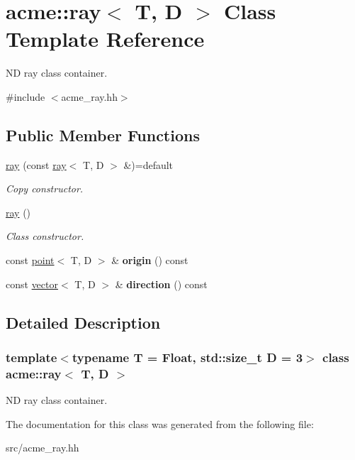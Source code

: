 \hypertarget{classacme_1_1ray}{}\section{acme\+:\+:ray$<$ T, D $>$ Class Template Reference}
\label{classacme_1_1ray}


ND ray class container.  




{\ttfamily \#include $<$acme\+\_\+ray.\+hh$>$}

\subsection*{Public Member Functions}
\begin{DoxyCompactItemize}
\item 
\mbox{\label{classacme_1_1ray_a181a7fb12af08ba45ff41f39920df03c}} 
\hyperlink{classacme_1_1ray_a181a7fb12af08ba45ff41f39920df03c}{ray} (const \hyperlink{classacme_1_1ray}{ray}$<$ T, D $>$ \&)=default
\begin{DoxyCompactList}\small\item\em Copy constructor. \end{DoxyCompactList}\item 
\mbox{\label{classacme_1_1ray_afc8290a7430024f99fb291dbb5bbcc62}} 
\hyperlink{classacme_1_1ray_afc8290a7430024f99fb291dbb5bbcc62}{ray} ()
\begin{DoxyCompactList}\small\item\em Class constructor. \end{DoxyCompactList}\item 
\mbox{\label{classacme_1_1ray_a0d9212763d822b70260723d277ea3cf1}} 
const \hyperlink{classacme_1_1point}{point}$<$ T, D $>$ \& {\bfseries origin} () const
\item 
\mbox{\label{classacme_1_1ray_af6ae286bbd1a15ba0c5f7419fc30a1fa}} 
const \hyperlink{classacme_1_1vector}{vector}$<$ T, D $>$ \& {\bfseries direction} () const
\end{DoxyCompactItemize}


\subsection{Detailed Description}
\subsubsection*{template$<$typename T = Float, std\+::size\+\_\+t D = 3$>$\newline
class acme\+::ray$<$ T, D $>$}

ND ray class container. 

The documentation for this class was generated from the following file\+:\begin{DoxyCompactItemize}
\item 
src/acme\+\_\+ray.\+hh\end{DoxyCompactItemize}

